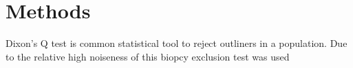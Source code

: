 \chapter{Methods}

Dixon's Q test is common statistical tool to reject outliners in a population. Due to the relative high noiseness of this biopcy  exclusion test was used 